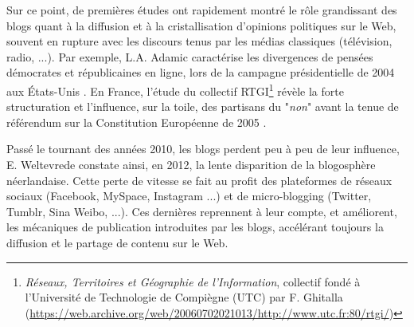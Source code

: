 \documentclass[symmetric,justified,marginals=raggedouter]{tufte-book}
\begin{document}
Sur ce point, de premières études ont rapidement montré le rôle grandissant des blogs quant à la diffusion et à la cristallisation d'opi\-nions politiques sur le Web, souvent en rupture avec les discours tenus par les médias classiques (télévision, radio, ...). Par exemple, L.A. Adamic caractérise les divergences de pensées démocrates et républicaines en ligne, lors de la campagne présidentielle de 2004 aux États-Unis \citep{adamic_political_2005, adar_implicit_2004}. En France, l'étude du collectif RTGI\footnote{\textit{Réseaux, Territoires et Géographie de l'Information}, collectif fondé à l'Université de Technologie de Compiègne (UTC) par F. Ghitalla (\url{https://web.archive.org/web/20060702021013/http://www.utc.fr:80/rtgi/})} révèle la forte structuration et l'influence, sur la toile, des partisans du "\textit{non}" avant la tenue de référendum sur la Constitution Européenne de 2005 \citep{fouetillou_web_2008}. 

Passé le tournant des années 2010, les blogs perdent peu à peu de leur influence, E. Weltevrede \citep{weltevrede_where_2012} constate ainsi, en 2012, la lente disparition de la blogosphère néerlandaise. Cette perte de vitesse se fait au profit des plateformes de réseaux sociaux (Facebook, MySpace, Instagram ...) et de micro-blogging (Twitter, Tumblr, Sina Weibo, ...). Ces dernières reprennent à leur compte, et améliorent, les mécaniques de publication introduites par les blogs, accélérant toujours la diffusion et le partage de contenu sur le Web.\\  
\end{document}
